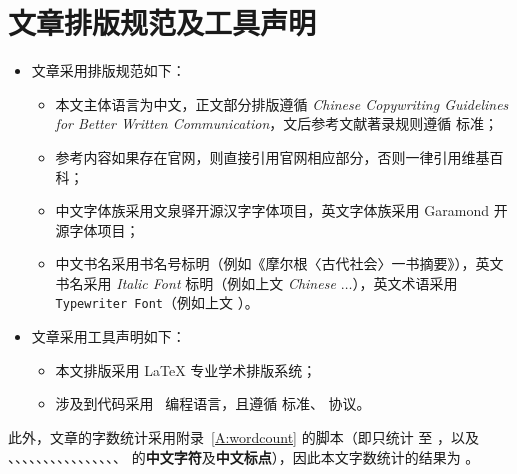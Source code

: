 \section{文章排版规范及工具声明}
\begin{itemize}
    \item 文章采用排版规范如下：
        \begin{itemize}
            \item 本文主体语言为中文，正文部分排版遵循 \emph{Chinese Copywriting Guidelines for Better Written Communication}\cite{liu2019chinese}，文后参考文献著录规则遵循 \gbt\cite{wiki2018文后参考文献著录规则} 标准；
            \item 参考内容如果存在官网，则直接引用官网相应部分，否则一律引用维基百科\cite{wiki2019wikipedia}；
            \item 中文字体族采用文泉驿\cite{wiki2019wqy}开源汉字字体项目，英文字体族采用 Garamond\cite{wiki2019garamond} 开源字体项目；
            \item 中文书名采用书名号标明（例如《摩尔根〈古代社会〉一书摘要》），英文书名采用 \emph{Italic Font} 标明（例如上文 \emph{Chinese $\ldots$}），英文术语采用 \texttt{Typewriter Font}（例如上文 \gbt）。
        \end{itemize}

    \item 文章采用工具声明如下：
        \begin{itemize}
            \item 本文排版采用 \LaTeX\cite{latex2019website} 专业学术排版系统；
            \item 涉及到代码采用 \python\ 编程语言，且遵循 \pepeight\cite{rossum2013pep} 标准、\mitlicense\cite{wiki2019mit} 协议。
        \end{itemize}
\end{itemize}

此外，文章的字数统计采用附录~\ref{A:wordcount} 的脚本（即只统计  至 ，以及 、、、、、、、、、、、、、、、、 的\textbf{中文字符}及\textbf{中文标点}），因此本文字数统计的结果为 \wordcount。

